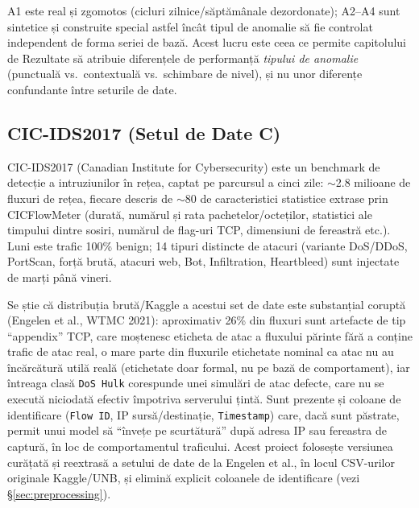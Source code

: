 \begin{center}
\end{center}

A1 este real și zgomotos (cicluri zilnice/săptămânale dezordonate); A2--A4 sunt sintetice și construite special astfel încât tipul de anomalie să fie controlat independent de forma seriei de bază. Acest lucru este ceea ce permite capitolului de Rezultate să atribuie diferențele de performanță \emph{tipului de anomalie} (punctuală vs.\ contextuală vs.\ schimbare de nivel), și nu unor diferențe confundante între seturile de date.

\subsection{CIC-IDS2017 (Setul de Date C)}

CIC-IDS2017 (Canadian Institute for Cybersecurity) este un benchmark de detecție a intruziunilor în rețea, captat pe parcursul a cinci zile: $\sim$2.8 milioane de fluxuri de rețea, fiecare descris de $\sim$80 de caracteristici statistice extrase prin CICFlowMeter (durată, numărul și rata pachetelor/octeților, statistici ale timpului dintre sosiri, numărul de flag-uri TCP, dimensiuni de fereastră etc.). Luni este trafic 100\% benign; 14 tipuri distincte de atacuri (variante DoS/DDoS, PortScan, forță brută, atacuri web, Bot, Infiltration, Heartbleed) sunt injectate de marți până vineri.

Se știe că distribuția brută/Kaggle a acestui set de date este substanțial coruptă (Engelen et al., WTMC 2021): aproximativ 26\% din fluxuri sunt artefacte de tip \enquote{appendix} TCP, care moștenesc eticheta de atac a fluxului părinte fără a conține trafic de atac real, o mare parte din fluxurile etichetate nominal ca atac nu au încărcătură utilă reală (etichetate doar formal, nu pe bază de comportament), iar întreaga clasă \texttt{DoS Hulk} corespunde unei simulări de atac defecte, care nu se execută niciodată efectiv împotriva serverului țintă. Sunt prezente și coloane de identificare (\texttt{Flow ID}, IP sursă/destinație, \texttt{Timestamp}) care, dacă sunt păstrate, permit unui model să \enquote{învețe pe scurtătură} după adresa IP sau fereastra de captură, în loc de comportamentul traficului. Acest proiect folosește versiunea curățată și reextrasă a setului de date de la Engelen et al., în locul CSV-urilor originale Kaggle/UNB, și elimină explicit coloanele de identificare (vezi \S\ref{sec:preprocessing}).

